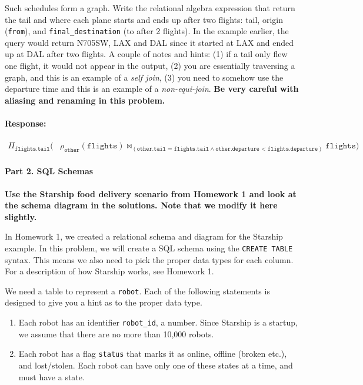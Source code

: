 \documentclass{report}
\renewcommand{\bf}[1]{\textbf{{#1}}}
\renewcommand{\tt}[1]{\texttt{{#1}}}
\newenvironment{response}{\begin{responseframe}\vspace{-10pt}\paragraph{Response:}}{\end{responseframe}}
\begin{document}
\begin{enumerate}[label=(\alph*)]
        Such schedules form a graph. Write the relational algebra expression that return the tail 
        and where each plane starts and ends up after two flights: tail, origin (\tt{from}), and 
        \tt{final\_destination} (to after 2 flights). In the example earlier, the query would 
        return N705SW, LAX and DAL since it started at LAX and ended up at DAL after two flights. 
        A couple of notes and hints: (1) if a tail only flew one flight, it would not appear in the 
        output, (2) you are essentially traversing a graph, and this is an example of a 
        \emph{self join}, (3) you need to somehow use the departure time and this is an example of 
        a \emph{non-equi-join}. \bf{Be very careful with aliasing and renaming in this problem.}
        \begin{response}
            \begin{align*}
                \Pi_{\tt{flights.tail}}
                (
                &\rho_{\tt{other}}(\tt{flights}) 
                \bowtie_{(\tt{other.tail = flights.tail} \land \tt{other.departure < flights.departure})} 
                \tt{flights}
                )
            \end{align*}
        \end{response}
\end{enumerate}

\paragraph{Part 2. SQL Schemas} \vspace{10pt} 

\bf{Use the Starship food delivery scenario from Homework 1 and look at the schema diagram in the 
solutions. Note that we modify it here slightly.} \vspace{10pt}

\noindent In Homework 1, we created a relational schema and diagram for the Starship example. In
this problem, we will create a SQL schema using the \tt{CREATE TABLE} syntax. This means we also need to
pick the proper data types for each column. For a description of how Starship works, see Homework 1.
\vspace{10pt}


\noindent We need a table to represent a \tt{robot}. Each of the following statements is designed to
give you a hint as to the proper data type.

\begin{enumerate} 
    \item Each robot has an identifier \tt{robot\_id}, a number. Since Starship is a startup, we
        assume that there are no more than 10,000 robots. 
    \item Each robot has a flag \tt{status} that marks it as online, offline (broken etc.), and
        lost/stolen. Each robot can have only one of these states at a time, and must have a state.
\end{enumerate}
\end{document}
